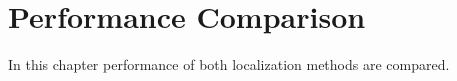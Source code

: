 \chapter{Performance Comparison}
\label{chap:performance}

In this chapter performance of both localization methods are compared.
